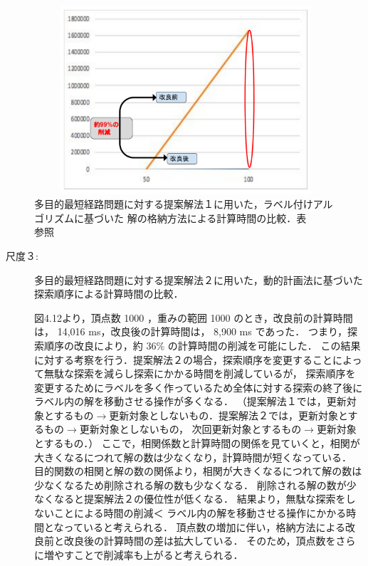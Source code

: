 \documentclass[12pt]{optlab-bachelor}
\begin{document}
\begin{figure}[htbp]
  \centering
  \includegraphics[height=7.0cm , width=15.0cm]{fig/fig14.pdf}
  \caption{多目的最短経路問題に対する提案解法１に用いた，ラベル付けアルゴリズムに基づいた
  解の格納方法による計算時間の比較．表　　参照}
\end{figure}


\begin{description}
  \item[尺度３:]
  多目的最短経路問題に対する提案解法２に用いた，動的計画法に基づいた探索順序による計算時間の比較．

  図4.12より，頂点数 1000 ，重みの範囲 1000 のとき，改良前の計算時間は， 14,016 ms，改良後の計算時間は， 8,900 ms であった．
  つまり，探索順序の改良により，約 36\% の計算時間の削減を可能にした．
  この結果に対する考察を行う．提案解法２の場合，探索順序を変更することによって無駄な探索を減らし探索にかかる時間を削減しているが，
  探索順序を変更するためにラベルを多く作っているため全体に対する探索の終了後にラベル内の解を移動させる操作が多くなる．
  （提案解法１では，更新対象とするもの$\rightarrow$更新対象としないもの．提案解法２では，更新対象とするもの$\rightarrow$更新対象としないもの，
  次回更新対象とするもの$\rightarrow$更新対象とするもの．）
  ここで，相関係数と計算時間の関係を見ていくと，相関が大きくなるにつれて解の数は少なくなり，計算時間が短くなっている．
  目的関数の相関と解の数の関係より，相関が大きくなるにつれて解の数は少なくなるため削除される解の数も少なくなる．
  削除される解の数が少なくなると提案解法２の優位性が低くなる．
  結果より，無駄な探索をしないことによる時間の削減＜
  ラベル内の解を移動させる操作にかかる時間となっていると考えられる．
  頂点数の増加に伴い，格納方法による改良前と改良後の計算時間の差は拡大している．
  そのため，頂点数をさらに増やすことで削減率も上がると考えられる．

\end{description}
\end{document}
